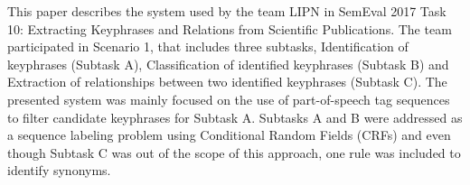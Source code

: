 This paper describes the system used by the team LIPN in SemEval 2017 Task 10: Extracting Keyphrases and Relations from Scientific Publications. The team participated in Scenario 1, that includes three subtasks, Identification of keyphrases (Subtask A), Classification of identified keyphrases (Subtask B) and Extraction of relationships between two identified keyphrases (Subtask C). The presented system was mainly focused on the use of part-of-speech tag sequences to filter candidate keyphrases for Subtask A. Subtasks A and B were addressed as a sequence labeling problem using Conditional Random Fields (CRFs) and even though Subtask C was out of the scope of this approach, one rule was included to identify synonyms.
